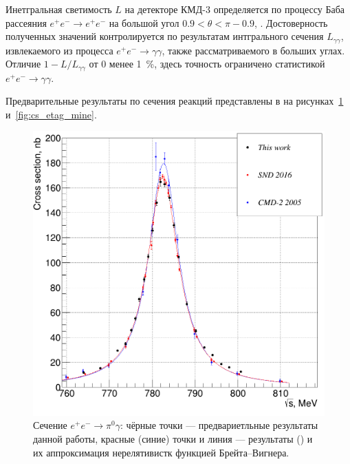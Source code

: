 Инетгральная светимость $L$ на детекторе КМД-3 определяется по процессу Баба рассеяния
$e^+e^- \to e^+e^-$ на большой угол $0.9 < \theta < \pi - 0.9$,
\cite{Ryzhenenkov:2017xqu}.
Достоверность полученных значений контролируется по результатам интгрального сечения $L_{\gamma \gamma}$,
извлекаемого из процесса $e^+e^- \to \gamma \gamma$,
также рассматриваемого в больших углах.
Отличие $1 - L / L_{\gamma \gamma}$ от 0 менее \SI{1}{\percent},
здесь точность ограничено статистикой $e^+e^- \to \gamma \gamma$.

Предварительные результаты по сечения реакций представлены в на рисунках~\ref{fig:cs_pi0g_mine} и~\ref{fig:cs_etag_mine}.

\begin{figure}[htbp]
	\begin{minipage}[T]{.48\textwidth}
		\centering
		\includegraphics[width=\textwidth]{img/my_pi0g_cross_section_for_pseudodisser.png}
		\caption{Сечение $e^+ e^- \to \pi^0 \gamma$:
			чёрные точки --- предвариетльные результаты данной работы,
			красные (синие) точки и линия --- результаты \cite{Achasov:2016bfr} (\cite{Akhmetshin:2004gw})
			и их аппроксимация нерелятивистк функцией Брейта--Вигнера.}\label{fig:cs_pi0g_mine}
	\end{minipage}
	\begin{minipage}[T]{.48\textwidth}
		\centering

\end{minipage}
\end{figure}
